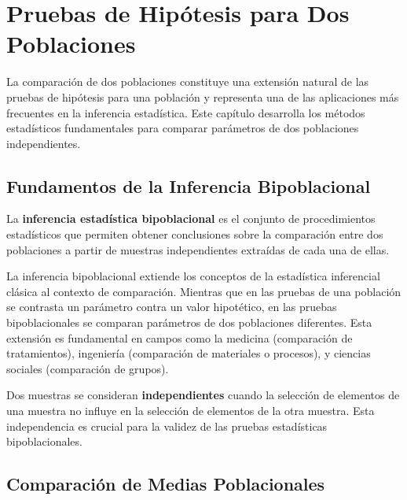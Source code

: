 \chapter{Pruebas de Hipótesis para Dos Poblaciones}

La comparación de dos poblaciones constituye una extensión natural de las pruebas de hipótesis para una población y representa una de las aplicaciones más frecuentes en la inferencia estadística. Este capítulo desarrolla los métodos estadísticos fundamentales para comparar parámetros de dos poblaciones independientes.

\section{Fundamentos de la Inferencia Bipoblacional}

\begin{definition}
La \textbf{inferencia estadística bipoblacional} es el conjunto de procedimientos estadísticos que permiten obtener conclusiones sobre la comparación entre dos poblaciones a partir de muestras independientes extraídas de cada una de ellas.
\end{definition}

\begin{remark}
La inferencia bipoblacional extiende los conceptos de la estadística inferencial clásica al contexto de comparación. Mientras que en las pruebas de una población se contrasta un parámetro contra un valor hipotético, en las pruebas bipoblacionales se comparan parámetros de dos poblaciones diferentes. Esta extensión es fundamental en campos como la medicina (comparación de tratamientos), ingeniería (comparación de materiales o procesos), y ciencias sociales (comparación de grupos).
\end{remark}

\begin{definition}
Dos muestras se consideran \textbf{independientes} cuando la selección de elementos de una muestra no influye en la selección de elementos de la otra muestra. Esta independencia es crucial para la validez de las pruebas estadísticas bipoblacionales.
\end{definition}

\section{Comparación de Medias Poblacionales}

